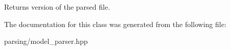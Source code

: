 \begin{DoxyReturn}{Returns}
version of the parsed file. 
\end{DoxyReturn}


The documentation for this class was generated from the following file\-:\begin{DoxyCompactItemize}
\item 
parsing/model\-\_\-parser.\-hpp\end{DoxyCompactItemize}
